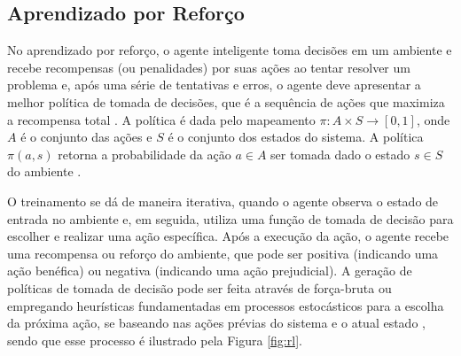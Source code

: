 \documentclass[
	12pt,				%
	openright,			%
	twoside,			%
	a4paper,			%
	tcc,			%
	]{ABNT-DC-UEL}
\begin{document}
\subsection{Aprendizado por Reforço}

No aprendizado por reforço, o agente inteligente toma decisões em um ambiente e recebe recompensas (ou penalidades) por suas ações ao tentar resolver um problema e, após uma série de tentativas e erros, o agente deve apresentar a melhor política de tomada de decisões, que é a sequência de ações que maximiza a recompensa total \cite{alpaydin:20}. A política é dada pelo mapeamento $\pi : A \times S \to [0,1]$, onde $A$ é o conjunto das ações e $S$ é o conjunto dos estados do sistema. A política $\pi(a,s)$ retorna a probabilidade da ação $a \in A$ ser tomada dado o estado $s \in S$ do ambiente \cite{kaelbiling:96}.

O treinamento se dá de maneira iterativa, quando o agente observa o estado de entrada no ambiente e, em seguida, utiliza uma função de tomada de decisão para escolher e realizar uma ação específica. Após a execução da ação, o agente recebe uma recompensa ou reforço do ambiente, que pode ser positiva (indicando uma ação benéfica) ou negativa (indicando uma ação prejudicial). A geração de políticas de tomada de decisão pode ser feita através de força-bruta ou empregando heurísticas fundamentadas em processos estocásticos para a escolha da próxima ação, se baseando nas ações prévias do sistema e o atual estado \cite{mohammed:16, kaelbiling:96}, sendo que esse processo é ilustrado pela Figura \ref{fig:rl}.
\end{document}
